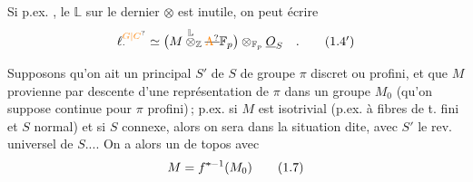 Si p.ex.  , le $\mathbb L$ sur le dernier $\otimes$ est inutile, on peut écrire
\[
\ell_{\cdot}^{\unsure{G|C}}\simeq\bigl(M\overset{\mathbb L}{\otimes}_{\mathbb Z}\deleted{\unsure{\Lambda}}\mathbb F_p\bigr)\otimes_{\mathbb F_p}\underline{O}_S
\quad .\tag*{$(1.4')$}
\]

 Supposons qu'on ait un  principal $S'$ de $S$ de groupe  $\pi$ discret ou profini, et que $M$ provienne par descente d'une  représentation de $\pi$ dans un groupe  $M_0$ (qu'on suppose continue pour $\pi$ profini)\,; p.ex. si $M$ est isotrivial (p.ex. à fibres de t. fini et $S$  normal) et si $S$ connexe, alors on sera dans la situation dite, avec $S'$ le rev. universel de $S$.... On a alors un  de topos
avec
\[
M=f^{\deleted{*}-1}(M_0)\tag*{(1.7)}
\]


